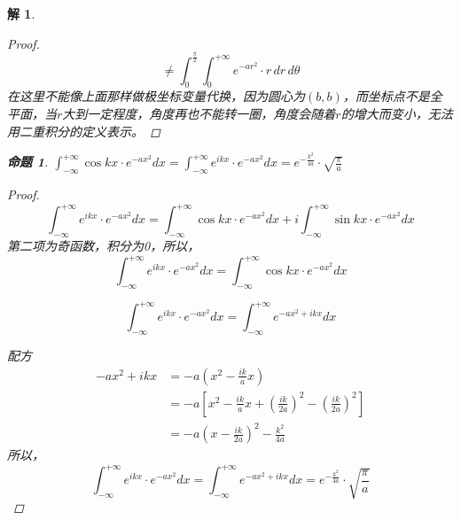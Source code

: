 \documentclass[12pt,a4paper]{article}
\newtheorem*{solution}{解}
\newtheorem{example}{命题}
\begin{document}
\begin{solution}
\begin{proof}
	\begin{equation*}
		\neq \int_{0}^{\frac{\pi}{2}} \int_{0}^{+\infty} e^{-ar^2} \cdot r \, dr \, d\theta
	\end{equation*}
	在这里不能像上面那样做极坐标变量代换，因为圆心为$(b,b)$，而坐标点不是全平面，当$r$大到一定程度，角度再也不能转一圈，角度会随着$r$的增大而变小，无法用二重积分的定义表示。

	
	\end{proof}

	
	\begin{example}\label{ex:3}
			$\int_{-\infty}^{+\infty} \cos kx \cdot e^{-a x^2} dx=\int_{-\infty}^{+\infty} e^{ikx} \cdot e^{-a x^2} dx= e^{-\frac{k^2}{4a}} \cdot \sqrt{\frac{\pi}{a}}$
	\end{example}
	
		\begin{proof}
	
\begin{equation*}
		\int_{-\infty}^{+\infty} e^{ikx} \cdot e^{-a x^2} dx =\int_{-\infty}^{+\infty} \cos kx \cdot e^{-a x^2} dx+i\int_{-\infty}^{+\infty} \sin kx \cdot e^{-a x^2} dx
\end{equation*}
第二项为奇函数，积分为0，所以，
\begin{equation*}
\int_{-\infty}^{+\infty} e^{ikx} \cdot e^{-a x^2} dx =\int_{-\infty}^{+\infty} \cos kx \cdot e^{-a x^2} dx
\end{equation*}

\begin{equation*}
	\int_{-\infty}^{+\infty} e^{ikx} \cdot e^{-a x^2} dx = \int_{-\infty}^{+\infty} e^{-a x^2 + ikx} dx
\end{equation*}

配方
\begin{equation*}
	\begin{split}
		-a x^2 + ikx &= -a \left( x^2 - \frac{ik}{a} x \right) \\
		&= -a \left[ x^2 - \frac{ik}{a} x + \left( \frac{ik}{2a} \right)^2 - \left( \frac{ik}{2a} \right)^2 \right] \\
		&= -a \left( x - \frac{ik}{2a} \right)^2 - \frac{k^2}{4a}
	\end{split}
\end{equation*}
所以，
	\begin{equation*}
		\int_{-\infty}^{+\infty} e^{ikx} \cdot e^{-a x^2} dx = \int_{-\infty}^{+\infty} e^{-a x^2 + ikx} dx	= e^{-\frac{k^2}{4a}} \cdot \sqrt{\frac{\pi}{a}}
	\end{equation*}
		\end{proof}
	

\end{solution}
\end{document}
